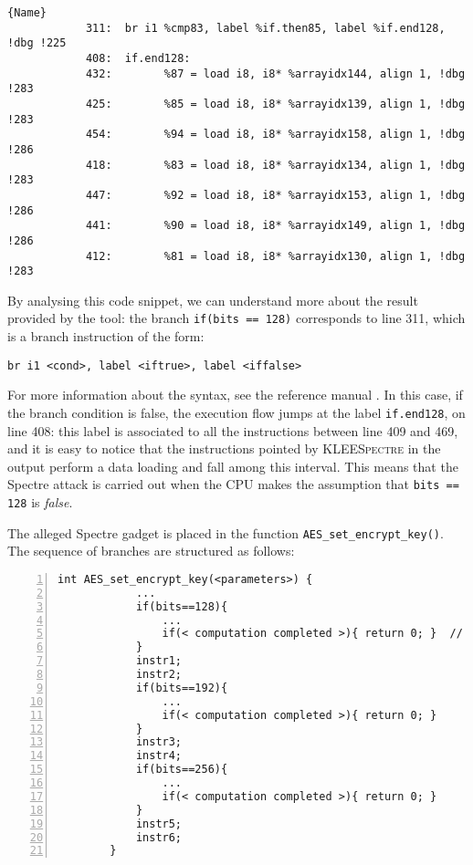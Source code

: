\documentclass[target=mst,aauheader=aics]{thud}
\theoremstyle{definition}
\begin{document}
	\begin{minipage}{\textwidth}
		\begin{lstlisting}[caption=\texttt{assembly.ll} (for AES-CBC), label=asm1, numbers=none]{Name}
			311:  br i1 %cmp83, label %if.then85, label %if.end128, !dbg !225
			408:  if.end128:                                        
			432:  		%87 = load i8, i8* %arrayidx144, align 1, !dbg !283
			425:  		%85 = load i8, i8* %arrayidx139, align 1, !dbg !283
			454:  		%94 = load i8, i8* %arrayidx158, align 1, !dbg !286
			418:  		%83 = load i8, i8* %arrayidx134, align 1, !dbg !283
			447:  		%92 = load i8, i8* %arrayidx153, align 1, !dbg !286
			441:  		%90 = load i8, i8* %arrayidx149, align 1, !dbg !286
			412:  		%81 = load i8, i8* %arrayidx130, align 1, !dbg !283
		\end{lstlisting}
	\end{minipage}
	\vspace{3mm}
	
	By analysing this code snippet, we can understand more about the result provided by the tool: the branch \texttt{if(bits == 128)} corresponds to line 311, which is a branch instruction of the form:
	
	\begin{lstlisting}[frame=none, numbers=none]
		br i1 <cond>, label <iftrue>, label <iffalse>
	\end{lstlisting}
	
	For more information about the syntax, see the reference manual \cite{LLVMasm}. In this case, if the branch condition is false, the execution flow jumps at the label \texttt{if.end128}, on line 408: this label is associated to all the instructions between line 409 and 469, and it is easy to notice that the instructions pointed by \textsc{KLEESpectre} in the output perform a data loading and fall among this interval. This means that the Spectre attack is carried out when the CPU makes the assumption that \texttt{bits == 128} is \textit{false}. 
	
	The alleged Spectre gadget is placed in the function \texttt{AES\_set\_encrypt\_key()}. The sequence of branches are structured as follows:
	
	\begin{lstlisting}[numbers=left]
		int AES_set_encrypt_key(<parameters>) {
			...
			if(bits==128){
				...
				if(< computation completed >){ return 0; }	// THE FUNCTION RETURNS
			}
			instr1;
			instr2;
			if(bits==192){
				...
				if(< computation completed >){ return 0; }
			}
			instr3;
			instr4;
			if(bits==256){
				...
				if(< computation completed >){ return 0; }
			}
			instr5;
			instr6;
		}
	\end{lstlisting}
	
\end{document}
